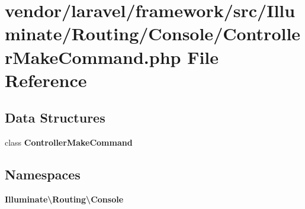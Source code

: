 \section{vendor/laravel/framework/src/\+Illuminate/\+Routing/\+Console/\+Controller\+Make\+Command.php File Reference}
\label{_controller_make_command_8php}
\subsection*{Data Structures}
\begin{DoxyCompactItemize}
\item 
class {\bf Controller\+Make\+Command}
\end{DoxyCompactItemize}
\subsection*{Namespaces}
\begin{DoxyCompactItemize}
\item 
 {\bf Illuminate\textbackslash{}\+Routing\textbackslash{}\+Console}
\end{DoxyCompactItemize}
